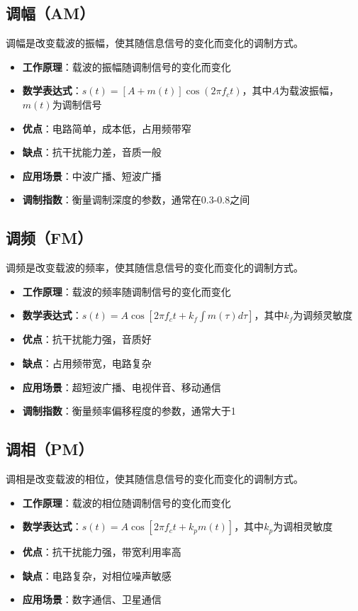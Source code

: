 \documentclass[12pt,UTF8]{ctexbook}
\begin{document}
\subsection{调幅（AM）}
调幅是改变载波的振幅，使其随信息信号的变化而变化的调制方式。
\begin{itemize}[leftmargin=3.5em]
    \item \textbf{工作原理}：载波的振幅随调制信号的变化而变化
    \item \textbf{数学表达式}：$s(t) = [A + m(t)]\cos(2\pi f_c t)$，其中$A$为载波振幅，$m(t)$为调制信号
    \item \textbf{优点}：电路简单，成本低，占用频带窄
    \item \textbf{缺点}：抗干扰能力差，音质一般
    \item \textbf{应用场景}：中波广播、短波广播
    \item \textbf{调制指数}：衡量调制深度的参数，通常在0.3-0.8之间
\end{itemize}

\subsection{调频（FM）}
调频是改变载波的频率，使其随信息信号的变化而变化的调制方式。
\begin{itemize}[leftmargin=3.5em]
    \item \textbf{工作原理}：载波的频率随调制信号的变化而变化
    \item \textbf{数学表达式}：$s(t) = A\cos[2\pi f_c t + k_f \int m(\tau)d\tau]$，其中$k_f$为调频灵敏度
    \item \textbf{优点}：抗干扰能力强，音质好
    \item \textbf{缺点}：占用频带宽，电路复杂
    \item \textbf{应用场景}：超短波广播、电视伴音、移动通信
    \item \textbf{调制指数}：衡量频率偏移程度的参数，通常大于1
\end{itemize}

\subsection{调相（PM）}
调相是改变载波的相位，使其随信息信号的变化而变化的调制方式。
\begin{itemize}[leftmargin=3.5em]
    \item \textbf{工作原理}：载波的相位随调制信号的变化而变化
    \item \textbf{数学表达式}：$s(t) = A\cos[2\pi f_c t + k_p m(t)]$，其中$k_p$为调相灵敏度
    \item \textbf{优点}：抗干扰能力强，带宽利用率高
    \item \textbf{缺点}：电路复杂，对相位噪声敏感
    \item \textbf{应用场景}：数字通信、卫星通信
\end{itemize}
\end{document}
